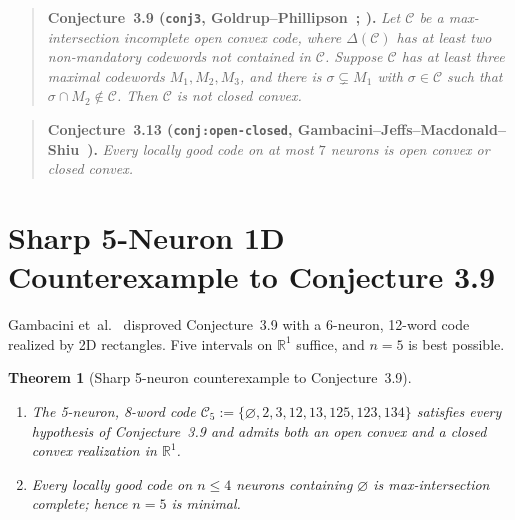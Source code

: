 \documentclass[11pt]{article}
\theoremstyle{plain}
\newtheorem{theorem}{Theorem}
\theoremstyle{definition}
\theoremstyle{remark}
\begin{document}
\begin{quote}
\textbf{Conjecture~3.9 (\texttt{conj3}, Goldrup--Phillipson~\cite[Conj.~4.3]{goldrup2020}; \cite{gambacini2022}).}
\emph{Let $\mathcal{C}$ be a max-intersection incomplete open convex code, where $\Delta(\mathcal{C})$ has at least two non-mandatory codewords not contained in $\mathcal{C}$. Suppose $\mathcal{C}$ has at least three maximal codewords $M_1, M_2, M_3$, and there is $\sigma \subsetneq M_1$ with $\sigma \in \mathcal{C}$ such that $\sigma \cap M_2 \notin \mathcal{C}$. Then $\mathcal{C}$ is not closed convex.}
\end{quote}

\begin{quote}
\textbf{Conjecture~3.13 (\texttt{conj:open-closed}, Gambacini--Jeffs--Macdonald--Shiu~\cite{gambacini2022}).}
\emph{Every locally good code on at most $7$ neurons is open convex or closed convex.}
\end{quote}

\section{Sharp 5-Neuron 1D Counterexample to Conjecture 3.9}

Gambacini et~al.~\cite[Theorem~3.10]{gambacini2022} disproved Conjecture~3.9 with a 6-neuron, 12-word code realized by 2D rectangles. Five intervals on $\mathbb{R}^1$ suffice, and $n = 5$ is best possible.

\begin{theorem}[Sharp 5-neuron counterexample to Conjecture~3.9]\label{thm:conj39}
\leavevmode
\begin{enumerate}[label=\textup{(\arabic*)}]
\item The 5-neuron, 8-word code $\mathcal{C}_5 := \{\varnothing, 2, 3, 12, 13, 125, 123, 134\}$ satisfies every hypothesis of Conjecture~3.9 and admits both an open convex and a closed convex realization in $\mathbb{R}^1$.
\item Every locally good code on $n \le 4$ neurons containing $\varnothing$ is max-intersection complete; hence $n = 5$ is minimal.
\end{enumerate}
\end{theorem}
\end{document}
